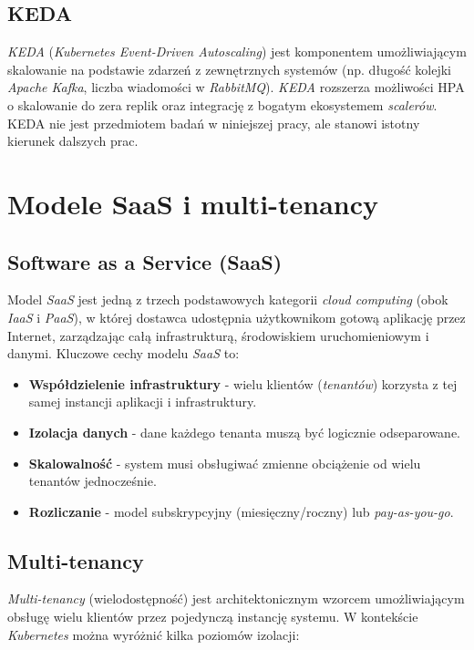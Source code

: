\subsection{KEDA}

\textit{KEDA} (\textit{Kubernetes Event-Driven Autoscaling}) jest komponentem umożliwiającym skalowanie na podstawie zdarzeń z zewnętrznych systemów (np. długość kolejki \textit{Apache Kafka}, liczba wiadomości w \textit{RabbitMQ}). \textit{KEDA} rozszerza możliwości HPA o skalowanie do zera replik oraz integrację z bogatym ekosystemem \textit{scalerów}. KEDA nie jest przedmiotem badań w niniejszej pracy, ale stanowi istotny kierunek dalszych prac.

\section{Modele SaaS i multi-tenancy}

\subsection{Software as a Service (SaaS)}

Model \textit{SaaS} jest jedną z trzech podstawowych kategorii \textit{cloud computing} (obok \textit{IaaS} i \textit{PaaS}), w której dostawca udostępnia użytkownikom gotową aplikację przez Internet, zarządzając całą infrastrukturą, środowiskiem uruchomieniowym i danymi. Kluczowe cechy modelu \textit{SaaS} to:

\begin{itemize}
  \item \textbf{Współdzielenie infrastruktury} - wielu klientów (\textit{tenantów}) korzysta z tej samej instancji aplikacji i infrastruktury.
  \item \textbf{Izolacja danych} - dane każdego tenanta muszą być logicznie odseparowane.
  \item \textbf{Skalowalność} - system musi obsługiwać zmienne obciążenie od wielu tenantów jednocześnie.
  \item \textbf{Rozliczanie} - model subskrypcyjny (miesięczny/roczny) lub \textit{pay-as-you-go}.
\end{itemize}

\subsection{Multi-tenancy}

\textit{Multi-tenancy} (wielodostępność) jest architektonicznym wzorcem umożliwiającym obsługę wielu klientów przez pojedynczą instancję systemu. W kontekście \textit{Kubernetes} można wyróżnić kilka poziomów izolacji:


